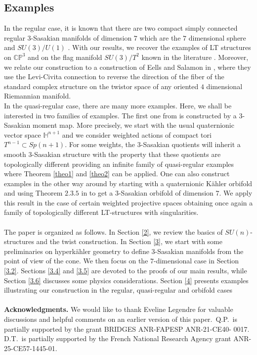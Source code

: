 \documentclass[12pt, reqno]{amsart}
\theoremstyle{definition}
\newcommand{\C}{\mathbb{C}}
\newcommand{\Hq}{\mathbb{H}}
\newcommand{\p}{\mathbb{P}}
\begin{document}
\subsection{Examples} In the regular case, it is known that there are two compact simply connected regular $3$-Sasakian manifolds of dimension $7$ which are the $7$ dimensional sphere and $SU(3)/U(1)$ \cite{Friedrich:1990zg}. With our results, we recover the examples of LT structures on $\C\p^3$ and on the flag manifold $SU(3)/T^2$ known in the literature \cite{Tomasiello_2008,Koerber_2008}. Moreover, we relate our construction to a construction of Eells and Salamon in \cite{EellsSalamon}, where they use the Levi-Civita connection to reverse the direction of the fiber of the standard complex structure on the twistor space of any oriented $4$ dimensional Riemannian manifold. \\
\indent In the quasi-regular case, there are many more examples. Here, we shall be interested in two families of examples. The first one from \cite{Boyer:1998sf} is constructed by a $3$-Sasakian moment map. More precisely, we start with the usual quaternionic vector space $\Hq^{n+1}$ and we consider weighted actions of compact tori $T^{n-1}\subset Sp(n+1)$. For some weights, the $3$-Sasakian quotients will inherit a smooth $3$-Sasakian structure with the property that these quotients are topologically different providing an infinite family of quasi-regular examples where Theorem \ref{theo1} and \ref{theo2} can be applied. One can also construct examples in the other way around by starting with a quaternionic Kähler orbifold and using Theorem $2.3.5$ in \cite{Boyer:1998sf} to get a $3$-Sasakian orbifold of dimension $7$. We apply this result in the case of certain weighted projective spaces obtaining once again a family of topologically different LT-structures with singularities. \\ \\
\indent The paper is organized as follows. In Section \ref{2}, we review the basics of $SU(n)$-structures and the twist construction. In Section \ref{3}, we start with some preliminaries on hyperkähler geometry to define $3$-Sasakian manifolds from the point of view of the cone. We then focus on the $7$-dimensional case in Section \ref{3.2}. Sections \ref{3.4} and \ref{3.5} are devoted to the proofs of our main results, while Section \ref{3.6} discusses some physics considerations. Section \ref{4} presents examples illustrating our construction in the regular,  quasi-regular and orbifold cases\\ \\
\textbf{Acknowledgments.} We would like to thank Eveline Legendre for valuable discussions and helpful comments on an earlier version of this paper.~Q.P.~is partially supported by the grant BRIDGES ANR-FAPESP ANR-21-CE40- 0017. D.T.~is partially supported by the French National Research Agency grant ANR-25-CE57-1445-01.
\end{document}
